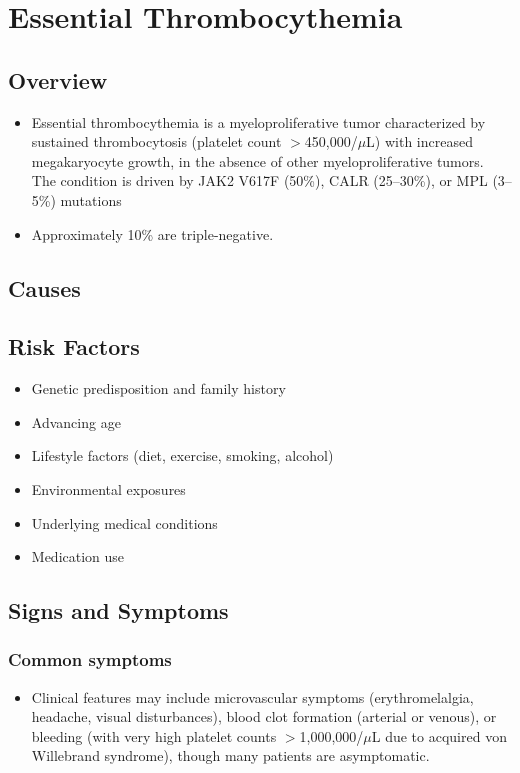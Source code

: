 \chapter{Essential Thrombocythemia}
\label{sec:Essential Thrombocythemia}

\section{Overview}


\begin{itemize}[noitemsep]
  \item Essential thrombocythemia is a myeloproliferative tumor characterized by sustained thrombocytosis (platelet count $>$450,000/$\mu$L) with increased megakaryocyte growth, in the absence of other myeloproliferative tumors. The condition is driven by JAK2 V617F (50\%), CALR (25--30\%), or MPL (3--5\%) mutations
  \item Approximately 10\% are triple-negative.
\end{itemize}
\section{Causes}
\section{Risk Factors}

\begin{itemize}[noitemsep]
  \item Genetic predisposition and family history
  \item Advancing age
  \item Lifestyle factors (diet, exercise, smoking, alcohol)
  \item Environmental exposures
  \item Underlying medical conditions
  \item Medication use
\end{itemize}
\section{Signs and Symptoms}

\subsection{Common symptoms}
\begin{itemize}[noitemsep]
  \item Clinical features may include microvascular symptoms (erythromelalgia, headache, visual disturbances), blood clot formation (arterial or venous), or bleeding (with very high platelet counts $>$1,000,000/$\mu$L due to acquired von Willebrand syndrome), though many patients are asymptomatic. 
  \end{itemize}

